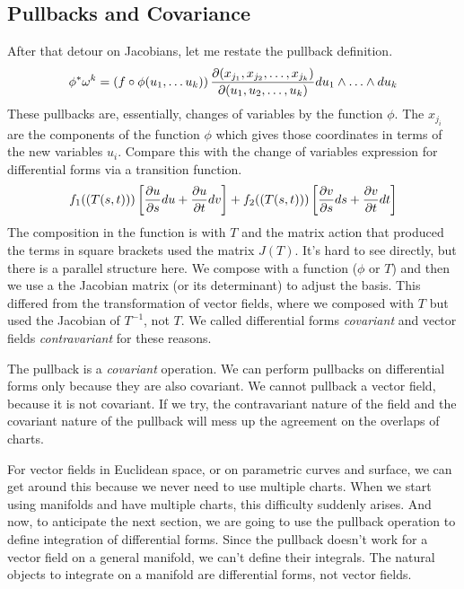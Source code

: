 \documentclass[fleqn,letterpaper]{report}
\begin{document}
\subsection{Pullbacks and Covariance}
\label{covariance}

After that detour on Jacobians, let me restate the pullback
definition.
\begin{equation*}
\phi^* \omega^k = \left(f \circ \phi(u_1, \ldots u_k) \right) 
\frac{\partial(x_{j_1}, x_{j_2}, \ldots, x_{j_k})}{\partial(u_1, u_2,
\ldots, u_k)} du_1 \wedge \ldots \wedge du_k
\end{equation*}
These pullbacks are, essentially, changes of variables by the
function $\phi$. The $x_{j_i}$ are the components of the
function $\phi$ which gives those coordinates in terms of the
new variables $u_i$. Compare this with the change of variables
expression for differential forms via a transition function. 
\begin{equation*}
f_1((T(s,t))) \left[ 
\frac{\partial u}{\partial s} du + 
\frac{\partial u}{\partial t} dv \right] + 
f_2((T(s,t))) \left[ 
\frac{\partial v}{\partial s} ds + 
\frac{\partial v}{\partial t} dt \right]
\end{equation*}
The composition in the function is with $T$ and the
matrix action that produced the terms in square brackets used
the matrix $J(T)$. It's hard to see directly, but there
is a parallel structure here. We compose with a function
($\phi$ or $T$) and then we use a the Jacobian matrix (or
its determinant) to adjust the basis. This differed from the
transformation of vector fields, where we composed with
$T$ but used the Jacobian of $T^{-1}$, not $T$. We called
differential forms \emph{covariant} and vector fields
\emph{contravariant} for these reasons. 

The pullback is a \emph{covariant} operation. We can perform
pullbacks on differential forms only because they are also
covariant. We cannot pullback a vector field, because it is
not covariant. If we try, the contravariant nature of the
field and the covariant nature of the pullback will mess up
the agreement on the overlaps of charts.

For vector fields in Euclidean space, or on parametric curves
and surface, we can get around this because we never need to
use multiple charts. When we start using manifolds and have
multiple charts, this difficulty suddenly arises. And now, to
anticipate the next section, we are going to use the pullback
operation to define integration of differential forms. Since
the pullback doesn't work for a vector field on a general
manifold, we can't define their integrals. The natural objects
to integrate on a manifold are differential forms, not vector
fields. 
\end{document}
